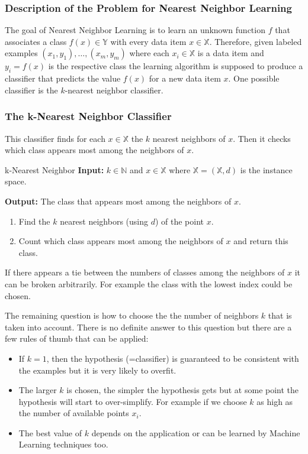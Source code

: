 \documentclass[english]{panikzettel}
\begin{document}
\subsubsection{Description of the Problem for Nearest Neighbor Learning}
The goal of Nearest Neighbor Learning is to learn an unknown function $f$ that associates a class $f(x)\in\mathbb{Y}$ with every data item $x\in \mathbb{X}$. Therefore, given labeled examples $(x_1,y_1),\ldots,(x_m,y_m)$ where each $x_i\in\mathbb{X}$ is a data item and $y_i=f(x)$ is the respective class the learning algorithm is supposed to produce a classifier that predicts the value $f(x)$ for a new data item $x$. One possible classifier is the $k$-nearest neighbor classifier.

\subsubsection{The k-Nearest Neighbor Classifier}
This classifier finds for each $x\in\mathbb{X}$ the $k$ nearest neighbors of $x$. Then it checks which class appears most among the neighbors of $x$.

\begin{algo}{k-Nearest Neighbor}
\textbf{Input:} $k\in\mathbb{N}$ and $x\in \mathbb{X}$ where $\mathbb{X}=(\mathbb{X}, d)$ is the instance space.

\textbf{Output:} The class that appears most among the neighbors of $x$.
\tcblower
\begin{enumerate}
\item Find the $k$ nearest neighbors (using $d$) of the point $x$.
\item Count which class appears most among the neighbors of $x$ and return this class.
\end{enumerate}
\end{algo}

If there appears a tie between the numbers of classes among the neighbors of $x$ it can be broken arbitrarily. For example the class with the lowest index could be chosen.

The remaining question is how to choose the the number of neighbors $k$ that is taken into account. There is no definite answer to this question but there are a few rules of thumb that can be applied:
\begin{itemize}
\item If $k=1$, then the hypothesis (=classifier) is guaranteed to be consistent with the examples but it is very likely to overfit.
\item The larger $k$ is chosen, the simpler the hypothesis gets but at some point the hypothesis will start to over-simplify. For example if we choose $k$ as high as the number of available points $x_i$.
\item The best value of $k$ depends on the application or can be learned by Machine Learning techniques too.
\end{itemize}
\end{document}

